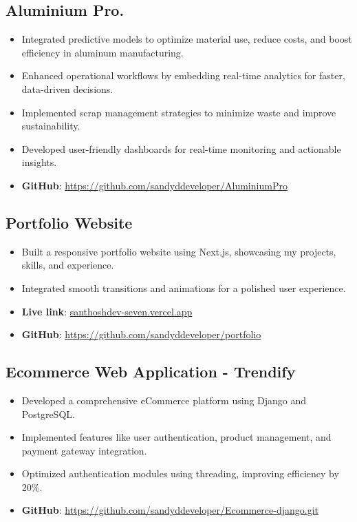 \documentclass[11pt]{article}
\begin{document}
\subsection{Aluminium Pro.} 
\begin{itemize}
    \item Integrated predictive models to optimize material use, reduce costs, and boost efficiency in aluminum manufacturing.
    \item Enhanced operational workflows by embedding real-time analytics for faster, data-driven decisions.
    \item Implemented scrap management strategies to minimize waste and improve sustainability.
    \item Developed user-friendly dashboards for real-time monitoring and actionable insights.
    \item \textbf{GitHub}: \href{https://github.com/sandyddeveloper/AluminiumPro}{https://github.com/sandyddeveloper/AluminiumPro}
\end{itemize}
\subsection{Portfolio Website} 
\begin{itemize}
    \item Built a responsive portfolio website using Next.js, showcasing my projects, skills, and experience.
    \item Integrated smooth transitions and animations for a polished user experience.
    \item \textbf{Live link}: \href{https://santhoshdev-seven.vercel.app/}{santhoshdev-seven.vercel.app}
    \item \textbf{GitHub}: \href{https://github.com/sandyddeveloper/portfolio}{https://github.com/sandyddeveloper/portfolio}
\end{itemize}

\subsection{Ecommerce Web Application - Trendify}
\begin{itemize}
    \item Developed a comprehensive eCommerce platform using Django and PostgreSQL.
    \item Implemented features like user authentication, product management, and payment gateway integration.
    \item Optimized authentication modules using threading, improving efficiency by 20\%.
    \item \textbf{GitHub}: \href{https://github.com/sandyddeveloper/Ecommerce-django.git}{https://github.com/sandyddeveloper/Ecommerce-django.git}
\end{itemize}
\end{document}
